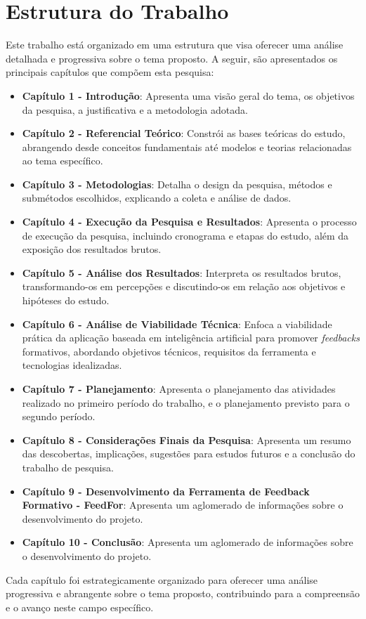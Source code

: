 \section{Estrutura do Trabalho}

Este trabalho está organizado em uma estrutura que visa oferecer uma análise detalhada e progressiva sobre o tema proposto. A seguir, são apresentados os principais capítulos que compõem esta pesquisa:

\begin{itemize}
    \item \textbf{Capítulo 1 - Introdução}: Apresenta uma visão geral do tema, os objetivos da pesquisa, a justificativa e a metodologia adotada.
    
    \item \textbf{Capítulo 2 - Referencial Teórico}: Constrói as bases teóricas do estudo, abrangendo desde conceitos fundamentais até modelos e teorias relacionadas ao tema específico.
    
    \item \textbf{Capítulo 3 - Metodologias}: Detalha o design da pesquisa, métodos e submétodos escolhidos, explicando a coleta e análise de dados.
    
    \item \textbf{Capítulo 4 - Execução da Pesquisa e Resultados}: Apresenta o processo de execução da pesquisa, incluindo cronograma e etapas do estudo, além da exposição dos resultados brutos.
    
    \item \textbf{Capítulo 5 - Análise dos Resultados}: Interpreta os resultados brutos, transformando-os em percepções e discutindo-os em relação aos objetivos e hipóteses do estudo.
    
    \item \textbf{Capítulo 6 - Análise de Viabilidade Técnica}: Enfoca a viabilidade prática da aplicação baseada em inteligência artificial para promover \textit{feedbacks} formativos, abordando objetivos técnicos, requisitos da ferramenta e tecnologias idealizadas.
    
    \item \textbf{Capítulo 7 - Planejamento}: Apresenta o planejamento das atividades realizado no primeiro período do trabalho, e o planejamento previsto para o segundo período.

    \item \textbf{Capítulo 8 - Considerações Finais da Pesquisa}: Apresenta um resumo das descobertas, implicações, sugestões para estudos futuros e a conclusão do trabalho de pesquisa.

    \item \textbf{Capítulo 9 - Desenvolvimento da Ferramenta de Feedback Formativo - FeedFor}: Apresenta um aglomerado de informações sobre o desenvolvimento do projeto.

    \item \textbf{Capítulo 10 - Conclusão}: Apresenta um aglomerado de informações sobre o desenvolvimento do projeto.
\end{itemize}

Cada capítulo foi estrategicamente organizado para oferecer uma análise progressiva e abrangente sobre o tema proposto, contribuindo para a compreensão e o avanço neste campo específico.

